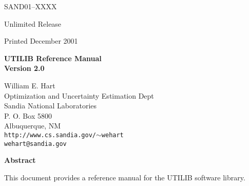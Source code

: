 \documentclass[10pt]{article}
\begin{document}
\pagestyle{empty}
\setcounter{page}{2}

\begin{center}
SAND01--XXXX

Unlimited Release

Printed December 2001
\end{center}

\vspace{0.8in}

\begin{center}
{\bf \LARGE UTILIB Reference Manual\\[1ex]\Large Version 2.0}
\vspace*{0.4in}

William E. Hart\\
Optimization and Uncertainty Estimation Dept\\
Sandia National Laboratories\\
P. O. Box 5800\\
Albuquerque, NM\\
{\tt http://www.cs.sandia.gov/$\sim$wehart}\\
{\tt wehart@sandia.gov}\\

\vspace*{1.0in}

{\bf\large Abstract}
\end{center}
This document provides a reference manual for the UTILIB software library.


\vfill
\newpage


\newpage

\tableofcontents
\clearemptydoublepage

\end{document}
